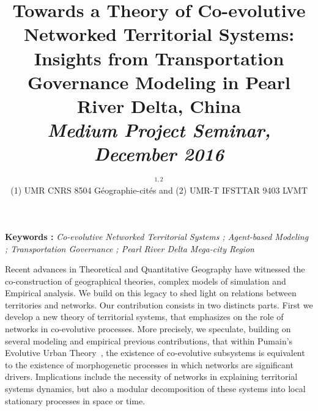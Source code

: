 


\title{Towards a Theory of Co-evolutive Networked Territorial Systems: Insights from Transportation Governance Modeling in Pearl River Delta, China\\\bigskip
\bigskip
\bigskip
\textit{Medium Project Seminar, December 2016}
}\bigskip
\bigskip
\author{$^{1,2}$\\
\small(1) UMR CNRS 8504 Géographie-cités and (2) UMR-T IFSTTAR 9403 LVMT
}
\date{}

\maketitle

\justify




\vspace{0.2cm}

\textbf{Keywords : }\textit{Co-evolutive Networked Territorial Systems ; Agent-based Modeling ; Transportation Governance ; Pearl River Delta Mega-city Region}

\vspace{0.5cm}

Recent advances in Theoretical and Quantitative Geography have witnessed the co-construction of geographical theories, complex models of simulation and Empirical analysis. We build on this legacy to shed light on relations between territories and networks. Our contribution consists in two distincts parts. First we develop a new theory of territorial systems, that emphasizes on the role of networks in co-evolutive processes. More precisely, we speculate, building on several modeling and empirical previous contributions, that within Pumain's Evolutive Urban Theory~\cite{pumain1997pour}, the existence of co-evolutive subsystems is equivalent to the existence of morphogenetic processes in which networks are significant drivers. Implications include the necessity of networks in explaining territorial systems dynamics, but also a modular decomposition of these systems into local stationary processes in space or time.

